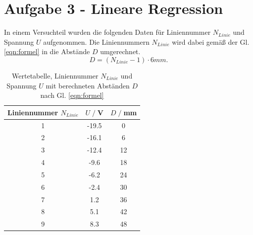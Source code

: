 \section*{Aufgabe 3 - Lineare Regression}
    In einem Versuchteil wurden die folgenden Daten für Liniennummer $N_{Linie}$
    und Spannung $U$ aufgenommen.
    Die Liniennummern $N_{Linie}$ wird dabei gemäß der Gl. \ref{eqn:formel} in die Abstände $D$ umgerechnet. 
    \begin{equation}
        D=(N_{Linie}-1) \cdot 6 \si{mm.}
        \label{eqn:formel}
    \end{equation}

    \begin{table}[H]
        \centering
        \begin{tabular}{c c c}
            \toprule
            Liniennummer $N_{Linie}$ & $U\;/\;$V & $D\;/\;$mm \\
            \midrule
            1&-19.5&0\\
            2&-16.1&6\\
            3&-12.4&12\\
            4&-9.6&18\\
            5&-6.2&24\\
            6&-2.4&30\\
            7&1.2&36\\
            8&5.1&42\\
            9&8.3&48\\
            \bottomrule
        \end{tabular}
        \caption{Wertetabelle, Liniennummer $N_{Linie}$ und Spannung $U$ mit berechneten
            Abständen $D$ nach Gl. \ref{eqn:formel}}
        \label{tab:tabelle}
    \end{table}

